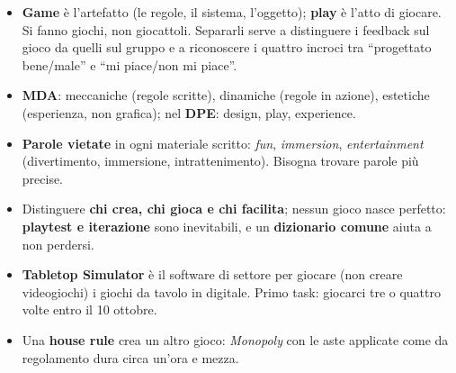 \begin{itemize}
        punta sulla localizzazione e investe poco su giochi e designer interni;
        all'estero (soprattutto dalla Germania in su) ci sono tradizione adulta,
        premi di prestigio e developer interni.
  \item \textbf{Game} è l'artefatto (le regole, il sistema, l'oggetto);
        \textbf{play} è l'atto di giocare. Si fanno giochi, non giocattoli.
        Separarli serve a distinguere i feedback sul gioco da quelli sul gruppo
        e a riconoscere i quattro incroci tra ``progettato bene/male'' e ``mi
        piace/non mi piace''.
  \item \textbf{MDA}: meccaniche (regole scritte), dinamiche (regole in azione),
        estetiche (esperienza, non grafica); nel \textbf{DPE}: design, play,
        experience.
  \item \textbf{Parole vietate} in ogni materiale scritto: \emph{fun},
        \emph{immersion}, \emph{entertainment} (divertimento, immersione,
        intrattenimento). Bisogna trovare parole più precise.
  \item Distinguere \textbf{chi crea, chi gioca e chi facilita}; nessun gioco
        nasce perfetto: \textbf{playtest e iterazione} sono inevitabili, e un
        \textbf{dizionario comune} aiuta a non perdersi.
  \item \textbf{Tabletop Simulator} è il software di settore per giocare (non
        creare videogiochi) i giochi da tavolo in digitale. Primo task: giocarci
        tre o quattro volte entro il 10 ottobre.
  \item Una \textbf{house rule} crea un altro gioco: \emph{Monopoly} con le aste
        applicate come da regolamento dura circa un'ora e mezza.
\end{itemize}
